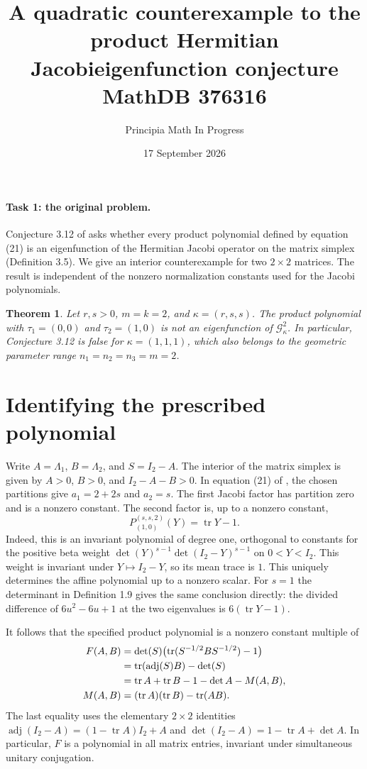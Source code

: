 \documentclass[11pt]{article}
\title{A quadratic counterexample to the product Hermitian Jacobi\linebreak eigenfunction conjecture\\\large MathDB 376316}
\author{Principia Math In Progress}
\date{17 September 2026}
\newtheorem{theorem}{Theorem}
\newcommand{\tr}{\operatorname{tr}}
\newcommand{\adj}{\operatorname{adj}}
\newcommand{\G}{\mathcal G}
\begin{document}
\maketitle

\paragraph{Task 1: the original problem.}
Conjecture 3.12 of \cite{K} asks whether every product polynomial defined
by equation (21) is an eigenfunction of the Hermitian Jacobi operator
on the matrix simplex (Definition 3.5). We give an interior counterexample
for two $2\times2$ matrices. The result is independent of the nonzero
normalization constants used for the Jacobi polynomials.

\begin{theorem}\label{thm}
Let $r,s>0$, $m=k=2$, and $\kappa=(r,s,s)$. The product polynomial with
$\tau_1=(0,0)$ and $\tau_2=(1,0)$ is not an eigenfunction of $\G^2_\kappa$.
In particular, Conjecture 3.12 is false for $\kappa=(1,1,1)$, which also
belongs to the geometric parameter range $n_1=n_2=n_3=m=2$.
\end{theorem}

\section*{Identifying the prescribed polynomial}
Write $A=\Lambda_1$, $B=\Lambda_2$, and $S=I_2-A$. The interior of the
matrix simplex is given by $A>0$, $B>0$, and $I_2-A-B>0$.
In equation (21) of \cite{K}, the chosen partitions give
$a_1=2+2s$ and $a_2=s$. The first Jacobi factor has partition zero and
is a nonzero constant. The second factor is, up to a nonzero constant,
\[
 P_{(1,0)}^{(s,s,2)}(Y)=\tr Y-1.
\]
Indeed, this is an invariant polynomial of degree one, orthogonal to
constants for the positive beta weight
$\det(Y)^{s-1}\det(I_2-Y)^{s-1}$ on $0<Y<I_2$. This weight is invariant
under $Y\mapsto I_2-Y$, so its mean trace is $1$. This uniquely determines
the affine polynomial up to a nonzero scalar. For $s=1$ the determinant
in Definition 1.9 gives the same conclusion directly: the divided
difference of $6u^2-6u+1$ at the two eigenvalues is
$6(\tr Y-1)$.

It follows that the specified product polynomial is a nonzero constant
multiple of
\begin{align}
 F(A,B)&=\det(S)\bigl(\tr(S^{-1/2}BS^{-1/2})-1\bigr)\notag\\
       &=\tr(\adj(S)B)-\det(S)\label{eq:F}\\
       &=\tr A+\tr B-1-\det A-M(A,B),\notag\\
 M(A,B)&=(\tr A)(\tr B)-\tr(AB).\notag
\end{align}
The last equality uses the elementary $2\times2$ identities
$\adj(I_2-A)=(1-\tr A)I_2+A$ and
$\det(I_2-A)=1-\tr A+\det A$. In particular, $F$ is a polynomial
in all matrix entries, invariant under simultaneous unitary conjugation.
\end{document}
